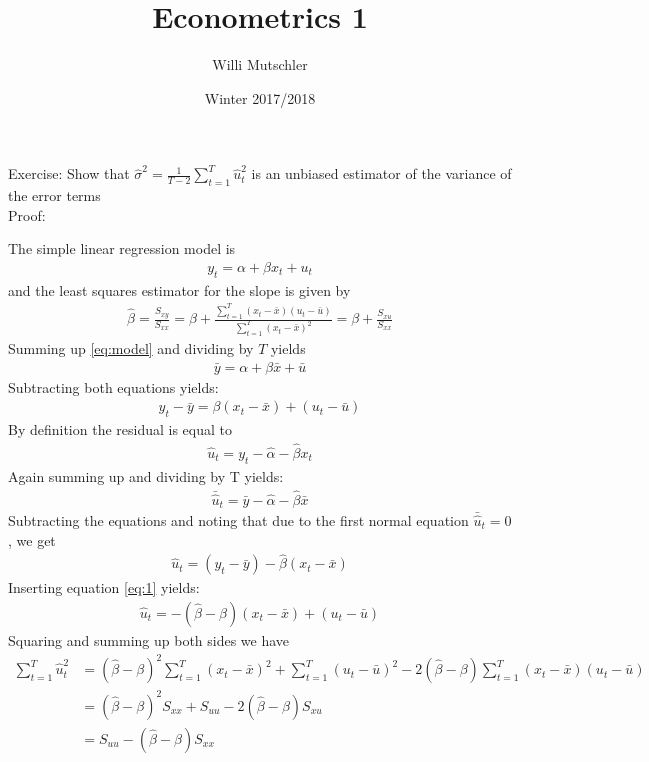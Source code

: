 \documentclass{article}
\begin{document}
\title{Econometrics 1}
\date{Winter 2017/2018}
\author{Willi Mutschler}
\maketitle

Exercise: Show that $\hat{\sigma}^2 = \frac{1}{T-2}\sum_{t=1}^T \hat{u}_t^2$ is an unbiased estimator of the variance of the error terms\\
Proof: 

The simple linear regression model is
\begin{align}
y_t = \alpha + \beta x_t + u_t \label{eq:model}
\end{align}
and the least squares estimator for the slope is given by
\begin{align}
\hat{\beta} = \frac{S_{xy}}{S_{xx}}  = \beta + \frac{\sum_{t=1}^{T}(x_t - \bar{x})(u_t - \bar{u})}{\sum_{t=1}^{T}(x_t - \bar{x})^2}= \beta + \frac{S_{xu}}{S_{xx}} \label{eq:estimator}
\end{align}
Summing up \eqref{eq:model} and dividing by $T$ yields 
\begin{align}
\bar{y} = \alpha + \beta \bar{x} + \bar{u}
\end{align}
Subtracting both equations yields:
\begin{align}
y_t - \bar{y} = \beta (x_t - \bar{x}) + (u_t - \bar{u})\label{eq:1}
\end{align}
By definition the residual is equal to
\begin{align*}
\hat{u}_t = y_t - \hat{\alpha} - \hat{\beta} x_t
\end{align*}
Again summing up and dividing by T yields:
\begin{align}
\bar{\hat{u}}_t = \bar{y} - \hat{\alpha} - \hat{\beta} \bar{x}
\end{align}
Subtracting the equations and noting that due to the first normal equation $\bar{\hat{u}}_t=0$, we get
\begin{align}
\hat{u}_t = (y_t - \bar{y}) -\hat{\beta} (x_t -\bar{x})
\end{align}
Inserting equation \eqref{eq:1} yields:
\begin{align}
\hat{u}_t = -(\hat{\beta}-\beta) (x_t -\bar{x}) + (u_t - \bar{u})
\end{align}
Squaring and summing up both sides we have
\begin{align}
\sum_{t=1}^{T}\hat{u}_t^2 &= (\hat{\beta}-\beta)^2 \sum_{t=1}^{T}(x_t -\bar{x})^2 + \sum_{t=1}^{T}(u_t - \bar{u})^2 -2 (\hat{\beta}-\beta)\sum_{t=1}^{T} (x_t - \bar{x})(u_t-\bar{u})\\
&= (\hat{\beta}-\beta)^2 S_{xx} + S_{uu} -2(\hat{\beta}-\beta)S_{xu}\\
&= S_{uu} -(\hat{\beta}-\beta)S_{xx} \label{eq:hatu2}
\end{align}
\end{document}

